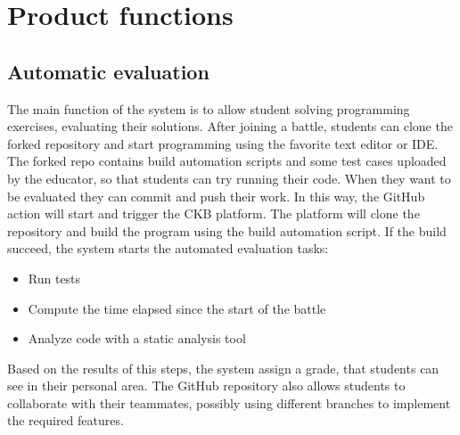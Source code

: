 \section{Product functions}
\subsection{Automatic evaluation}
The main function of the system is to allow student solving programming exercises, evaluating their solutions.
After joining a battle, students can clone the forked repository and start programming using the favorite text editor or IDE.
The forked repo contains build automation scripts and some test cases  uploaded by the educator, so that students can try running their code.
When they want to be evaluated they can commit and push their work. In this way, the GitHub action will start and trigger the CKB platform.
The platform will clone the repository and build the program using the build automation script.
If the build succeed, the system starts the automated evaluation tasks:
\begin{itemize}
	\item Run tests
	\item Compute the time elapsed since the start of the battle
	\item Analyze code with a static analysis tool
\end{itemize}
Based on the results of this steps, the system assign a grade, that students can see in their personal area.
The GitHub repository also allows students to collaborate with their teammates, possibly using different branches to implement the required features.
\begin{adjustbox}{
		max size={\textwidth}{},
		caption={Automatic evaluation activity diagram},
		label={fig:Automatic evaluation activity diagram},
		figure=H}
	\centering
\end{adjustbox}

